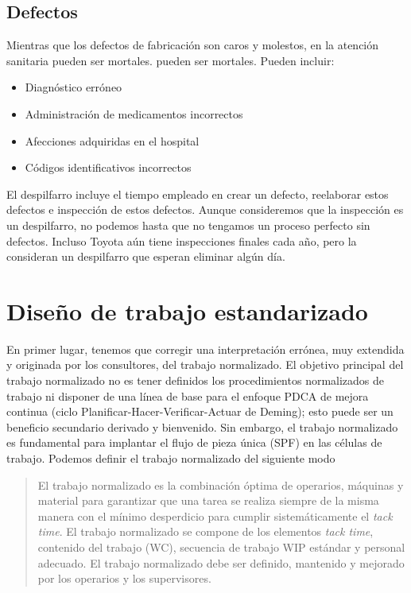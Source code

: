 \subsection{Defectos}

Mientras que los defectos de fabricación son caros y molestos, en la atención sanitaria pueden ser mortales. pueden ser mortales. Pueden incluir:

\begin{itemize}
    \item Diagnóstico erróneo
    \item Administración de medicamentos incorrectos
    \item Afecciones adquiridas en el hospital
    \item Códigos identificativos incorrectos
\end{itemize}

El despilfarro incluye el tiempo empleado en crear un defecto, reelaborar estos defectos e inspección de estos defectos. Aunque consideremos que la inspección es un despilfarro, no podemos hasta que no tengamos un proceso perfecto sin defectos. Incluso Toyota aún tiene inspecciones finales cada año, pero la consideran un despilfarro que esperan eliminar algún día.

\section{Diseño de trabajo estandarizado}

En primer lugar, tenemos que corregir una interpretación errónea, muy extendida y originada por los consultores, del trabajo normalizado.
El objetivo principal del trabajo normalizado no es tener definidos los procedimientos normalizados de trabajo ni disponer de una línea de base para el enfoque PDCA de mejora continua (ciclo Planificar-Hacer-Verificar-Actuar de Deming); esto puede ser un beneficio secundario derivado y bienvenido.
Sin embargo, el trabajo normalizado es fundamental para implantar el flujo de pieza única (SPF) en las células de trabajo. Podemos definir el trabajo normalizado del siguiente modo

\begin{quote}
    El trabajo normalizado es la combinación óptima de operarios, máquinas y material para garantizar que una tarea se realiza siempre de la misma manera con el mínimo desperdicio para cumplir sistemáticamente el \textit{tack time}.
    El trabajo normalizado se compone de los elementos \textit{tack time}, contenido del trabajo (WC), secuencia de trabajo WIP estándar y personal adecuado.
    El trabajo normalizado debe ser definido, mantenido y mejorado por los operarios y los supervisores.
\end{quote}

